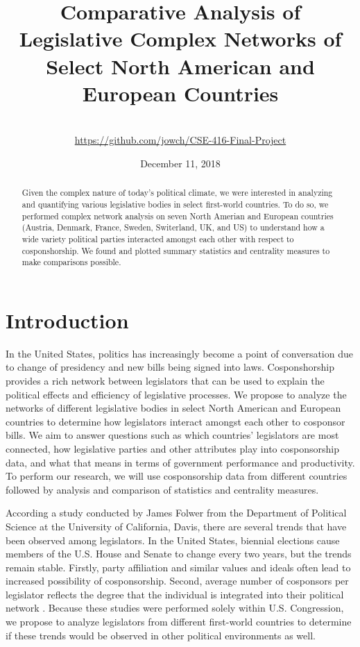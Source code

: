 \documentclass[12pt]{article}
\title{Comparative Analysis of Legislative Complex Networks of Select North American and European Countries}
\author{\names \\ \small\url{https://github.com/jowch/CSE-416-Final-Project}}
\date{December 11, 2018}
\begin{document}
\maketitle
\thispagestyle{empty}

\begin{abstract}
    Given the complex nature of today's political climate, we were interested in analyzing and quantifying various legislative bodies in select first-world countries. To do so, we performed complex network analysis on seven North Amerian and European countries (Austria, Denmark, France, Sweden, Switerland, UK, and US) to understand how a wide variety political parties interacted amongst each other with respect to cosponshorship. We found and plotted summary statistics and centrality measures to make comparisons possible.
\end{abstract}

\section{Introduction} 

In the United States, politics has increasingly become a point of conversation due to change of presidency and new bills being signed into laws. Cosponshorship provides a rich network between legislators that can be used to explain the political effects and efficiency of legislative processes. We propose to analyze the networks of different legislative bodies in select North American and European countries to determine how legislators interact amongst each other to cosponsor bills. We aim to answer questions such as which countries' legislators are most connected, how legislative parties and other attributes play into cosponsorship data, and what that means in terms of government performance and productivity. To perform our research, we will use cosponsorship data from different countries followed by analysis and comparison of statistics and centrality measures.

According a study conducted by James Folwer from the Department of Political Science at the University of California, Davis, there are several trends that have been observed among legislators. In the United States, biennial elections cause members of the U.S. House and Senate to change every two years, but the trends remain stable. Firstly, party affiliation and similar values and ideals often lead to increased possibility of cosponsorship. Second, average number of cosponsors per legislator reflects the degree that the individual is integrated into their political network \cite{fowler1}. Because these studies were performed solely within U.S. Congression, we propose to analyze legislators from different first-world countries to determine if these trends would be observed in other political environments as well.
 
\end{document}
